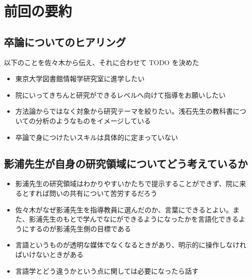 \hypertarget{ux524dux56deux306eux8981ux7d04}{%
\section{前回の要約}\label{ux524dux56deux306eux8981ux7d04}}

\hypertarget{ux5352ux8ad6ux306bux3064ux3044ux3066ux306eux30d2ux30a2ux30eaux30f3ux30b0}{%
\subsection{卒論についてのヒアリング}\label{ux5352ux8ad6ux306bux3064ux3044ux3066ux306eux30d2ux30a2ux30eaux30f3ux30b0}}

以下のことを佐々木から伝え、それに合わせて TODO を決めた\cite{ChongShi2011}

\begin{itemize}
\tightlist
\item
  東京大学図書館情報学研究室に進学したい
\item
  院にいってきちんと研究ができるレベルへ向けて指導をお願いしたい
\item
  方法論からではなく対象から研究テーマを絞りたい。浅石先生の教科書についての分析のようなものをイメージしている
\item
  卒論で身につけたいスキルは具体的に定まっていない
\end{itemize}

\hypertarget{ux5f71ux6d66ux5148ux751fux304cux81eaux8eabux306eux7814ux7a76ux9818ux57dfux306bux3064ux3044ux3066ux3069ux3046ux8003ux3048ux3066ux3044ux308bux304b}{%
\subsection{影浦先生が自身の研究領域についてどう考えているか}\label{ux5f71ux6d66ux5148ux751fux304cux81eaux8eabux306eux7814ux7a76ux9818ux57dfux306bux3064ux3044ux3066ux3069ux3046ux8003ux3048ux3066ux3044ux308bux304b}}

\begin{itemize}
\tightlist
\item
  影浦先生の研究領域はわかりやすいかたちで提示することができず、院に来るとすれば問いの共有について苦労するだろう
\item
  佐々木がなぜ影浦先生を指導教員に選んだのか、言葉にできるとよい。また、影浦先生のもとで学んでなにができるようになったかを言語化できるようにするのが影浦先生側の目標である
\item
  言語というものが透明な媒体でなくなるときがあり、明示的に操作しなければいけないときがある
\item
  言語学とどう違うかという点に関しては必要になったら話す
\end{itemize}

